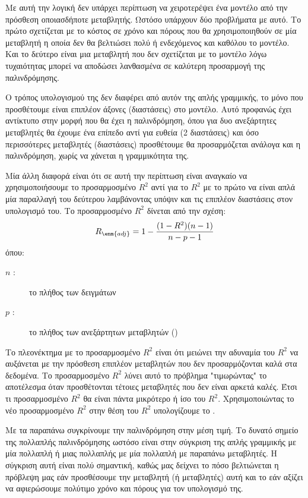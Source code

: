Με αυτή την λογική δεν υπάρχει περίπτωση να χειροτερέψει ένα μοντέλο από την
πρόσθεση οποιασδήποτε μεταβλητής. Ωστόσο υπάρχουν δύο προβλήματα με αυτό. Το
πρώτο σχετίζεται με το κόστος σε χρόνο και πόρους που θα χρησιμοποιηθούν σε μία
μεταβλητή η οποία δεν θα βελτιώσει πολύ ή ενδεχόμενος και καθόλου το μοντέλο. Και το
δεύτερο είναι μια μεταβλητή που δεν σχετίζεται με το μοντέλο λόγω τυχαιότητας μπορεί να
αποδώσει λανθασμένα σε καλύτερη προσαρμογή της παλινδρόμησης.

Ο τρόπος
υπολογισμού της δεν διαφέρει από αυτόν της απλής γραμμικής, το μόνο που προσθέτουμε
είναι επιπλέον άξονες (διαστάσεις) στο μοντέλο. Αυτό προφανώς έχει αντίκτυπο στην μορφή
που θα έχει η παλινδρόμηση, όπου για δυο ανεξάρτητες μεταβλητές θα έχουμε ένα επίπεδο
αντί για ευθεία (2 διαστάσεις) και όσο περισσότερες μεταβλητές (διαστάσεις) προσθέτουμε
θα προσαρμόζεται ανάλογα και η παλινδρόμηση, χωρίς να χάνεται η γραμμικότητα της.

Μία άλλη
διαφορά είναι ότι σε αυτή την περίπτωση είναι αναγκαίο να χρησιμοποιήσουμε το
προσαρμοσμένο $R^2$ αντί για το $R^2$ με το πρώτο να είναι απλά μία παραλλαγή του δεύτερου
λαμβάνοντας υπόψιν και τις επιπλέον διαστάσεις στον υπολογισμό του. Το προσαρμοσμένο
$R^2$ δίνεται από την σχέση:
$$R_{\enm{adj}}=1-\frac{(1-R^2)(n-1)}{n-p-1}$$
όπου:
\begin{description}
    \item[$n$ :] το πλήθος των δειγμάτων
    \item[$p$ :] το πλήθος των ανεξάρτητων μεταβλητών ()
\end{description}
Το πλεονέκτημα με το προσαρμοσμένο $R^2$
είναι ότι μειώνει την αδυναμία του $R^2$
να
αυξάνεται με την πρόσθεση επιπλέον μεταβλητών που δεν προσαρμόζονται καλά στα
δεδομένα. Το προσαρμοσμένο $R^2$
λύνει αυτό το πρόβλημα "τιμωρώντας" το αποτέλεσμα
όταν προσθέτονται τέτοιες μεταβλητές που δεν είναι αρκετά καλές. Έτσι τι προσαρμοσμένο $R^2$
θα είναι πάντα μικρότερο ή ίσο του $R^2$. Χρησιμοποιώντας το νέο προσαρμοσμένο $R^2$ στην
θέση του $R^2$ υπολογίζουμε το .

Με τα παραπάνω συγκρίνουμε την παλινδρόμηση στην μέση τιμή. Το δυνατό σημείο της
πολλαπλής παλινδρόμησης ωστόσο είναι στην σύγκριση της απλής γραμμικής με μία
πολλαπλή ή μιας πολλαπλής με μία πολλαπλή με παραπάνω μεταβλητές. Η σύγκριση αυτή
είναι πολύ σημαντική, καθώς μας δείχνει το πόσο βελτιώνεται η πρόβλεψη μας εάν
προσθέσουμε την μεταβλητή (ή μεταβλητές) αυτή και το εάν αξίζει να αφιερώσουμε
πολύτιμο χρόνο και πόρους για τον υπολογισμό της.

